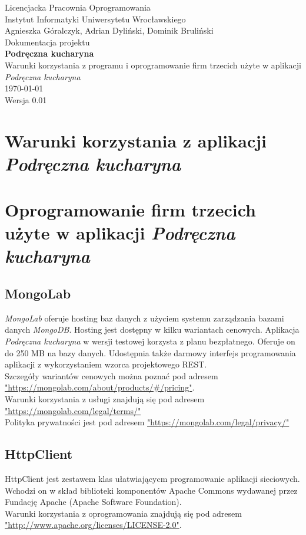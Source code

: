 \documentclass[12pt,leqno, twoside]{mwart}
\begin{document}
\thispagestyle{empty}
\begin{center}
Licencjacka Pracownia Oprogramowania \\ Instytut
Informatyki Uniwersytetu Wrocławskiego \\
\vspace{4cm}
\Large Agnieszka Góralczyk, Adrian Dyliński, Dominik Bruliński \\
\vspace{0.5cm}
\huge Dokumentacja projektu\\ \textbf{Podręczna kucharyna}\\ \Large Warunki korzystania z programu i oprogramowanie firm trzecich użyte w aplikacji \emph{Podręczna kucharyna} \\
\vspace{1cm}
\normalsize \today \\
\vspace{2cm}
\normalsize Wersja 0.01
\end{center}

\newpage
\usepackage{hyperref}
\section{Warunki korzystania z aplikacji \emph{Podręczna kucharyna} }
\section{Oprogramowanie firm trzecich użyte w aplikacji \emph{Podręczna kucharyna} }
\subsection{MongoLab}
\emph{MongoLab} oferuje hosting baz danych z użyciem systemu zarządzania bazami danych \emph{MongoDB}.
Hosting jest dostępny w kilku wariantach cenowych.
Aplikacja \emph{Podręczna kucharyna} w wersji testowej korzysta z planu bezpłatnego.
Oferuje on do 250 MB na bazy danych.
Udostępnia także darmowy interfejs programowania aplikacji z wykorzystaniem wzorca projektowego REST. \\
Szczegóły wariantów cenowych można poznać pod adresem \url{"https://mongolab.com/about/products/#/pricing"}. \\
Warunki korzystania z usługi znajdują się pod adresem \url{"https://mongolab.com/legal/terms/"}\\
Polityka prywatności jest pod adresem \url{"https://mongolab.com/legal/privacy/"}
\subsection{HttpClient}
HttpClient jest zestawem klas ułatwiającycm programowanie aplikacji sieciowych.
Wchodzi on w skład biblioteki komponentów Apache Commons wydawanej przez Fundację Apache (Apache Software Foundation). \\
Warunki korzystania z oprogramowania znajdują się pod adresem \url{"http://www.apache.org/licenses/LICENSE-2.0"}.
\end{document}
